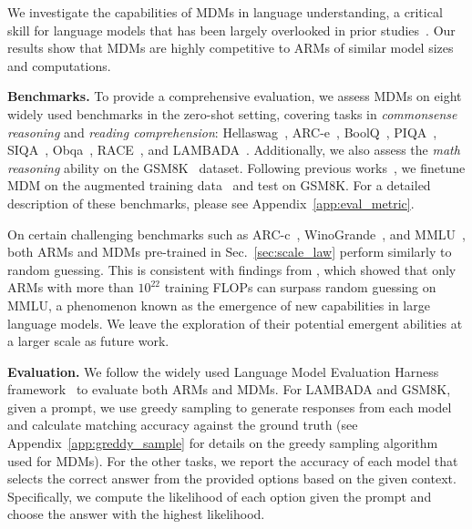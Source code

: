 \documentclass{article} %
\begin{document}
We investigate the capabilities of MDMs in language understanding, a critical skill for language models that has been largely overlooked in prior studies~\citep{austin2021structured, lou2023discrete, sahoo2024simple, shi2024simplified,ou2024your,gat2024discrete}. Our results show that MDMs are highly competitive to ARMs of similar model sizes and computations.

\textbf{Benchmarks.} To provide a comprehensive evaluation, we assess MDMs on eight widely used benchmarks in the zero-shot setting, covering tasks in \emph{commonsense reasoning} and \emph{reading comprehension}: Hellaswag~\citep{zellers2019hellaswag}, ARC-e~\citep{clark2018think}, BoolQ~\citep{clark2019boolq}, PIQA~\citep{bisk2020piqa}, SIQA~\citep{sap2019social}, Obqa~\citep{mihaylov2018can}, RACE~\citep{lai2017race}, and LAMBADA~\citep{paperno2016lambada}. Additionally, we also assess the \emph{math reasoning} ability on the GSM8K~\citep{cobbe2021gsm8k} dataset. Following previous works~\cite{ye2024diffusion, gong2024scaling}, we finetune MDM on the augmented training data~\citep{deng2023implicit} and test on GSM8K. For a detailed description of these benchmarks, please see Appendix~\ref{app:eval_metric}.

On certain challenging benchmarks such as ARC-c~\citep{clark2018think}, WinoGrande~\citep{sakaguchi2021winogrande}, and MMLU~\citep{hendrycks2020measuring}, both ARMs and MDMs pre-trained in Sec.~\ref{sec:scale_law} perform similarly to random guessing. This is consistent with findings from \citet{wei2022emergent}, which showed that only ARMs with more than $10^{22}$ training FLOPs can surpass random guessing on MMLU, a phenomenon known as the emergence of new capabilities in large language models. We leave the exploration of their potential emergent abilities at a larger scale as future work. 

\textbf{Evaluation.} We follow the widely used Language Model Evaluation Harness framework~\citep{eval-harness} to evaluate both ARMs and MDMs. For LAMBADA and GSM8K, given a prompt, we use greedy sampling to generate responses from each model and calculate matching accuracy against the ground truth (see Appendix~\ref{app:greddy_sample} for details on the greedy sampling algorithm used for MDMs). For the other tasks, we report the accuracy of each model that selects the correct answer from the provided options based on the given context. Specifically, we compute the likelihood of each option given the prompt and choose the answer with the highest likelihood.
\end{document}
